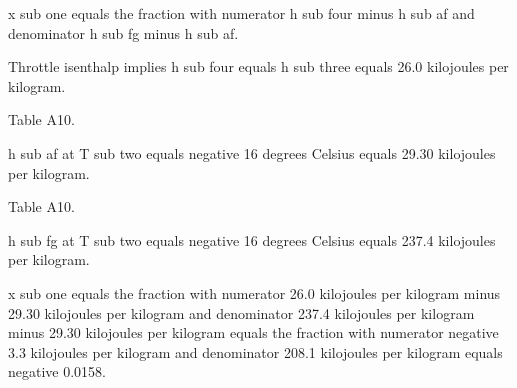 x sub one equals the fraction with numerator h sub four minus h sub af and denominator h sub fg minus h sub af.

Throttle isenthalp implies h sub four equals h sub three equals 26.0 kilojoules per kilogram.

Table A10.

h sub af at T sub two equals negative 16 degrees Celsius equals 29.30 kilojoules per kilogram.

Table A10.

h sub fg at T sub two equals negative 16 degrees Celsius equals 237.4 kilojoules per kilogram.

x sub one equals the fraction with numerator 26.0 kilojoules per kilogram minus 29.30 kilojoules per kilogram and denominator 237.4 kilojoules per kilogram minus 29.30 kilojoules per kilogram equals the fraction with numerator negative 3.3 kilojoules per kilogram and denominator 208.1 kilojoules per kilogram equals negative 0.0158.